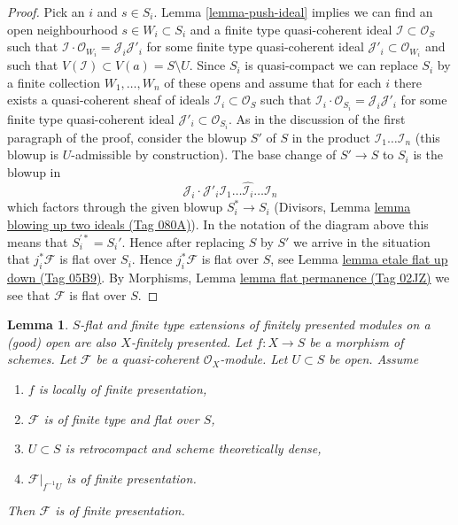 \documentclass{amsart}
\newenvironment{slogan}{\comment}{\endcomment}
\theoremstyle{plain}
\newtheorem{lemma}[subsection]{Lemma}
\theoremstyle{definition}
\theoremstyle{remark}
\numberwithin{equation}{subsection}
\begin{document}
\begin{proof}
\medskip\noindent
Pick an $i$ and $s \in S_i$. Lemma \ref{lemma-push-ideal}
implies we can find an open neighbourhood $s \in W_i \subset S_i$
and a finite type quasi-coherent ideal $\mathcal{I} \subset \mathcal{O}_S$
such that $\mathcal{I} \cdot \mathcal{O}_{W_i} = \mathcal{J}_i \mathcal{J}'_i$
for some finite type quasi-coherent ideal
$\mathcal{J}'_i \subset \mathcal{O}_{W_i}$
and such that $V(\mathcal{I}) \subset V(a) = S \setminus U$.
Since $S_i$ is quasi-compact we can replace $S_i$ by a finite collection
$W_1, \ldots, W_n$ of these opens and assume that for each $i$ there exists
a quasi-coherent sheaf of ideals $\mathcal{I}_i \subset \mathcal{O}_S$ such
that $\mathcal{I}_i \cdot \mathcal{O}_{S_i} = \mathcal{J}_i \mathcal{J}'_i$
for some finite type quasi-coherent ideal
$\mathcal{J}'_i \subset \mathcal{O}_{S_i}$.
As in the discussion of the first paragraph of the proof, consider the
blowup $S'$ of $S$ in the product $\mathcal{I}_1 \ldots \mathcal{I}_n$
(this blowup is $U$-admissible by construction). The base change of $S' \to S$
to $S_i$ is the blowup in
$$
\mathcal{J}_i \cdot
\mathcal{J}'_i \mathcal{I}_1 \ldots \hat{\mathcal{I}_i} \ldots \mathcal{I}_n
$$
which factors through the given blowup $S_i^* \to S_i$
(Divisors, Lemma \href{https://stacks.math.columbia.edu/tag/080A}{lemma blowing up two ideals (Tag 080A)}). In the notation
of the diagram above this means that $S_i^{\prime *} = S_i'$. Hence
after replacing $S$ by $S'$ we arrive in the situation that
$j_i^*\mathcal{F}$ is flat over $S_i$. Hence $j_i^*\mathcal{F}$ is flat
over $S$, see
Lemma \href{https://stacks.math.columbia.edu/tag/05B9}{lemma etale flat up down (Tag 05B9)}.
By Morphisms, Lemma \href{https://stacks.math.columbia.edu/tag/02JZ}{lemma flat permanence (Tag 02JZ)}
we see that $\mathcal{F}$ is flat over $S$.
\end{proof}


\begin{lemma}
\label{lemma-flat-finite-type-finitely-presented-over-dense-open}
\begin{slogan}
$S$-flat and finite type extensions of finitely presented modules
on a (good) open are also $X$-finitely presented.
\end{slogan}
Let $f : X \to S$ be a morphism of schemes. Let $\mathcal{F}$ be a
quasi-coherent $\mathcal{O}_X$-module. Let $U \subset S$ be open.
Assume
\begin{enumerate}
\item $f$ is locally of finite presentation,
\item $\mathcal{F}$ is of finite type and flat over $S$,
\item $U \subset S$ is retrocompact and scheme theoretically dense,
\item $\mathcal{F}|_{f^{-1}U}$ is of finite presentation.
\end{enumerate}
Then $\mathcal{F}$ is of finite presentation.
\end{lemma}
\end{document}

